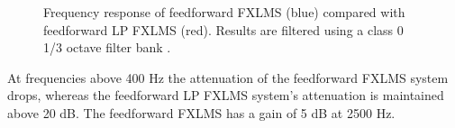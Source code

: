 \begin{figure}[H]
	\centering
	
	\caption{Frequency response of feedforward FXLMS (blue) compared with feedforward LP FXLMS (red). Results are filtered using a class 0 1/3 octave filter bank \cite{OctaveBand}.}
	\label{fig:ANCcompareALL}
\end{figure}        
At frequencies above 400 Hz the attenuation of the feedforward FXLMS system drops, whereas the feedforward LP FXLMS system's attenuation is maintained above 20 dB. The feedforward FXLMS has a gain of 5 dB at 2500 Hz.  
        










